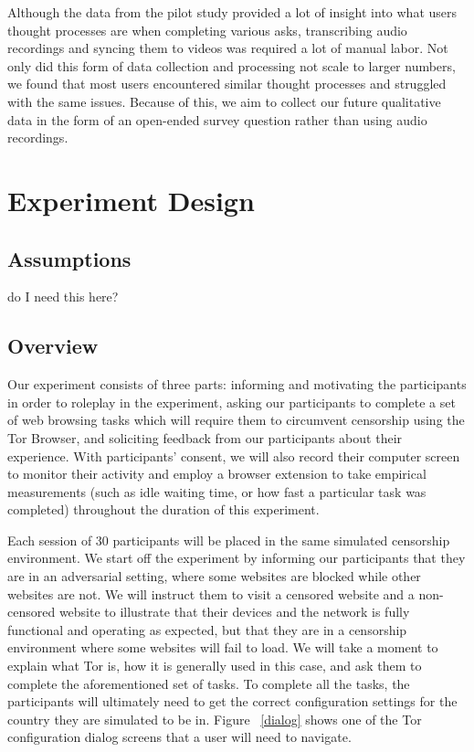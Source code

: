 \documentclass[letterpaper,twocolumn,11pt]{article}
\begin{document}
Although the data from the pilot study provided a lot of insight into what users thought processes
are when completing various asks, transcribing audio recordings and syncing them to videos was
required a lot of manual labor. Not only did this form of data collection and processing not scale 
to larger numbers, we found that most users encountered similar thought processes and struggled
with the same issues. Because of this, we aim to collect our future qualitative data in the form of 
an open-ended survey question rather than using audio recordings. 

\section{Experiment Design}

\subsection{Assumptions} 
{\color{red} do I need this here?}

\subsection{Overview} 
Our experiment consists of three parts: informing and motivating the participants in order 
to roleplay in the experiment, asking our participants to complete a set of web browsing tasks which will 
require them to circumvent censorship using the Tor Browser, and soliciting feedback from our participants
about their experience. With participants' consent, we will also record their computer screen to monitor 
their activity and employ a browser extension to take empirical measurements (such as idle waiting time, 
or how fast a particular task was completed) throughout the duration of this experiment. 

Each session of 30 participants will be placed in the same simulated censorship environment. 
We start off the experiment by informing our participants that they are in an adversarial setting, 
where some websites are blocked while other websites are not. We will instruct them to visit a censored
website and a non-censored website to illustrate that their devices and the network is fully functional and
operating as expected, but that they are in a censorship environment where some websites will fail to load. 
We will take a moment to explain what Tor is, how it is generally used in this case, and ask them to complete 
the aforementioned set of tasks. To complete all the tasks, the participants will ultimately need to get the correct
configuration settings for the country they are simulated to be in.  Figure ~\ref{dialog} shows one of the 
Tor configuration dialog screens that a user will need to navigate. 
\end{document}

